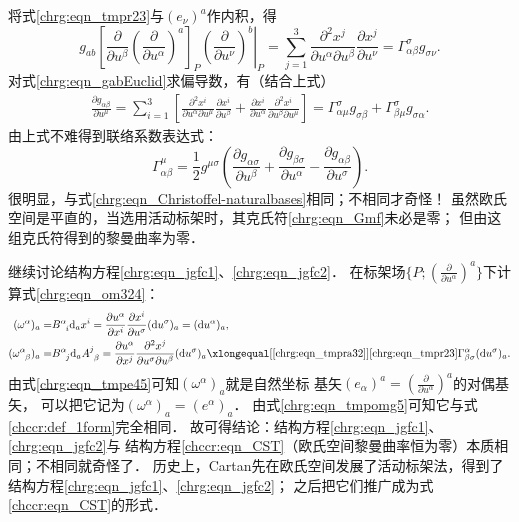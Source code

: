 将式\eqref{chrg:eqn_tmpr23}与$(e_\nu)^a$作内积，得
\begin{equation}
    g_{ab} \left[\frac{\partial }{\partial u^\beta} \left(\frac{\partial}{\partial u^\alpha}\right)^a\right]_P
    \left. \left(\frac{\partial}{\partial u^\nu}\right)^b\right|_{P}
    = \sum_{j=1}^{3}\frac{\partial^2 x^j}{\partial u^\alpha\partial u^\beta}
    \frac{\partial x^j}{\partial u^\nu}
    = \Gamma^\sigma_{\alpha\beta} g_{\sigma\nu}  .
\end{equation}
对式\eqref{chrg:eqn_gabEuclid}求偏导数，有（结合上式）
\begin{align}
    \frac{\partial g_{\alpha\beta}}{\partial u^\mu} = 
    \sum_{i=1}^{3}\left[\frac{\partial^2 x^i}{\partial u^\alpha\partial u^\mu}
    \frac{\partial x^i}{\partial u^\beta}+ \frac{\partial x^i}{\partial u^\alpha}
    \frac{\partial^2 x^i}{\partial u^\beta\partial u^\mu}   \right] 
    = \Gamma^\sigma_{\alpha\mu} g_{\sigma\beta} + \Gamma^\sigma_{\beta\mu} g_{\sigma\alpha} .
\end{align}
由上式不难得到联络系数表达式：
\begin{equation}\label{chrg:eqn_Gmf}
    \Gamma^\mu_{\alpha\beta}= \frac{1}{2} g^{\mu\sigma}\left(
    \frac{\partial g_{\alpha\sigma}}{\partial u^\beta}+
    \frac{\partial g_{\beta\sigma}}{\partial u^\alpha}-
    \frac{\partial g_{\alpha\beta}}{\partial u^\sigma}\right) .
\end{equation}
很明显，与式\eqref{chrg:eqn_Christoffel-naturalbases}相同；不相同才奇怪！
虽然欧氏空间是平直的，当选用活动标架时，其克氏符\eqref{chrg:eqn_Gmf}未必是零；
但由这组克氏符得到的黎曼曲率为零．



继续讨论结构方程\eqref{chrg:eqn_jgfc1}、\eqref{chrg:eqn_jgfc2}．
在标架场$\{P;(\frac{\partial}{\partial u^\alpha})^a\}$下计算式\eqref{chrg:eqn_om324}：
\begin{align}
    (\omega^\alpha)_a =& B^{\alpha}_{\hphantom{\alpha} i} {\rm d}_a x^i=\frac{\partial u^\alpha}{\partial x^i}
    \frac{\partial x^i}{\partial u^\sigma}({\rm d}u^\sigma)_a=({\rm d}u^\alpha)_a, \label{chrg:eqn_tmpe45} \\
    (\omega^{\alpha}_{\hphantom{\alpha} \beta})_a=&B^{\alpha}_{\hphantom{\alpha} j}{\rm d}_a A^j_{\hphantom{j} \beta}
    =\frac{\partial u^\alpha}{\partial x^j} \frac{\partial^2 x^j}
    {\partial u^\sigma\partial u^\beta}({\rm d}u^\sigma)_a
    \xlongequal[\ref{chrg:eqn_tmpra32}]{\ref{chrg:eqn_tmpr23}}
    \Gamma^\alpha_{\beta \sigma}({\rm d}u^\sigma)_a. \label{chrg:eqn_tmpomg5}
\end{align}
由式\eqref{chrg:eqn_tmpe45}可知$(\omega^\alpha)_a$就是自然坐标
基矢$(e_\alpha)^a=(\frac{\partial}{\partial u^\alpha})^a$的对偶基矢，
可以把它记为$(\omega^\alpha)_a=(e^\alpha)_a$．
由式\eqref{chrg:eqn_tmpomg5}可知它与式\eqref{chccr:def_1form}完全相同．
故可得结论：结构方程\eqref{chrg:eqn_jgfc1}、\eqref{chrg:eqn_jgfc2}与
结构方程\eqref{chccr:eqn_CST}（欧氏空间黎曼曲率恒为零）本质相同；不相同就奇怪了．
历史上，Cartan先在欧氏空间发展了活动标架法，得到了结构方程\eqref{chrg:eqn_jgfc1}、\eqref{chrg:eqn_jgfc2}；
之后把它们推广成为式\eqref{chccr:eqn_CST}的形式．


